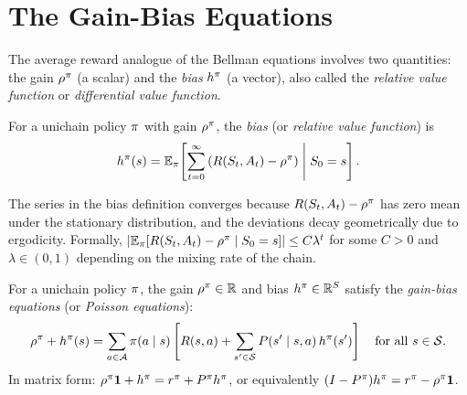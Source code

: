 \documentclass[11pt,a4paper]{article}
\begin{document}

\section{The Gain-Bias Equations}
\label{sec:gain-bias}

The average reward analogue of the Bellman equations involves two
quantities: the gain $\rho^\pi$ (a scalar) and the \emph{bias}
$h^\pi$ (a vector), also called the \emph{relative value
function} or \emph{differential value function}.

\begin{definition}
\label{def:bias}
For a unichain policy $\pi$ with gain $\rho^\pi$, the
\emph{bias} (or \emph{relative value function}) is
\[
    h^\pi(s) = \mathbb{E}_\pi\!\left[
    \sum_{t=0}^{\infty} \left(R(S_t, A_t) - \rho^\pi\right)
    \;\middle|\; S_0 = s \right].
\]
\end{definition}

\begin{remark}
\label{rem:bias-convergence}
The series in the bias definition converges because $R(S_t, A_t) -
\rho^\pi$ has zero mean under the stationary distribution, and
the deviations decay geometrically due to ergodicity. Formally,
$|\mathbb{E}_\pi[R(S_t, A_t) - \rho^\pi \mid S_0 = s]| \leq
C \lambda^t$ for some $C > 0$ and $\lambda \in (0,1)$ depending on
the mixing rate of the chain.
\end{remark}

\begin{theorem}
\label{thm:gain-bias-eval}
For a unichain policy $\pi$, the gain $\rho^\pi \in \mathbb{R}$ and
bias $h^\pi \in \mathbb{R}^S$ satisfy the \emph{gain-bias equations}
(or \emph{Poisson equations}):
\begin{equation}
\label{eq:gain-bias}
    \rho^\pi + h^\pi(s) = \sum_{a \in \mathcal{A}}
    \pi(a \mid s) \left[ R(s,a) + \sum_{s' \in \mathcal{S}}
    P(s' \mid s,a)\, h^\pi(s') \right]
    \quad \text{for all } s \in \mathcal{S}.
\end{equation}
In matrix form: $\rho^\pi \mathbf{1} + h^\pi =
r^\pi + P^\pi h^\pi$, or equivalently
$(I - P^\pi) h^\pi = r^\pi -
\rho^\pi \mathbf{1}$.
\end{theorem}
\end{document}
